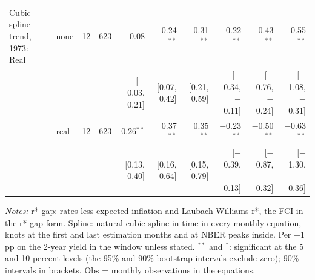 \begin{table}[tp]
{\begin{tabular}{llcrrrrrrr}
\addlinespace
Cubic spline trend, 1973: Real & none & 12 & 623 & 0.08 & 0.24$^{**}$ & 0.31$^{**}$ & $-$0.22$^{**}$ & $-$0.43$^{**}$ & $-$0.55$^{**}$\\
 & & & & {\scriptsize [$-$0.03, 0.21]} & {\scriptsize [0.07, 0.42]} & {\scriptsize [0.21, 0.59]} & {\scriptsize [$-$0.34, $-$0.11]} & {\scriptsize [$-$0.76, $-$0.24]} & {\scriptsize [$-$1.08, $-$0.31]}\\
 & real & 12 & 623 & 0.26$^{**}$ & 0.37$^{**}$ & 0.35$^{**}$ & $-$0.23$^{**}$ & $-$0.50$^{**}$ & $-$0.63$^{**}$\\
 & & & & {\scriptsize [0.13, 0.40]} & {\scriptsize [0.16, 0.64]} & {\scriptsize [0.15, 0.79]} & {\scriptsize [$-$0.39, $-$0.13]} & {\scriptsize [$-$0.87, $-$0.32]} & {\scriptsize [$-$1.30, $-$0.36]}\\
\bottomrule\end{tabular}}
\begin{flushleft}\footnotesize\textit{Notes:} r*-gap: rates less expected inflation and Laubach-Williams r*, the FCI in the r*-gap form. Spline: natural cubic spline in time in every monthly equation, knots at the first and last estimation months and at NBER peaks inside. Per +1 pp on the 2-year yield in the window unless stated. $^{**}$ and $^{*}$: significant at the 5 and 10 percent levels (the 95\% and 90\% bootstrap intervals exclude zero); 90\% intervals in brackets. Obs = monthly observations in the equations.\end{flushleft}
\end{table}
